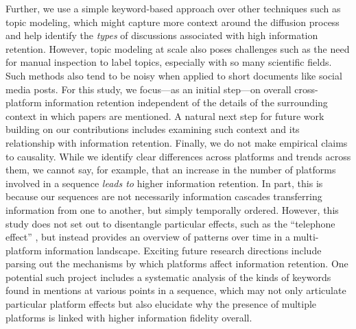 \documentclass[letterpaper]{article} %
\begin{document}
Further, we use a simple keyword-based approach over other techniques such as topic modeling, which might capture more context around the diffusion process and help identify the \textit{types} of discussions associated with high information retention. However, topic modeling at scale also poses challenges such as the need for manual inspection to label topics, especially with so many scientific fields. Such methods also tend to be noisy when applied to short documents like social media posts. For this study, we focus---as an initial step---on overall cross-platform information retention independent of the details of the surrounding context in which papers are mentioned. A natural next step for future work building on our contributions includes examining such context and its relationship with information retention.  Finally, we do not make empirical claims to causality. While we identify clear differences across platforms and trends across them, we cannot say, for example, that an increase in the number of platforms involved in a sequence \emph{leads to} higher information retention. In part, this is because our sequences are not necessarily information cascades transferring information from one to another, but simply temporally ordered. However, this study does not set out to disentangle particular effects, such as the ``telephone effect'' \citep{ribeiroMessageDistortionInformation2019}, but instead provides an overview of patterns over time in a multi-platform information landscape. Exciting future research directions include parsing out the mechanisms by which platforms affect information retention. One potential such project includes a systematic analysis of the kinds of keywords found in mentions at various points in a sequence, which may not only articulate particular platform effects but also elucidate why the presence of multiple platforms is linked with higher information fidelity overall.

\vspace{-3.02mm}
\end{document}
